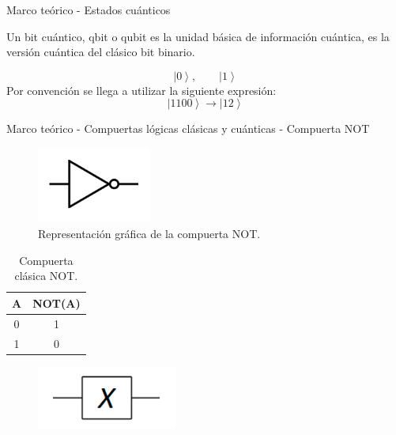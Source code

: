 \begin{frame}{Marco teórico - Estados cuánticos}
\begin{defi}
Un bit cuántico, qbit o qubit es la unidad básica de información cuántica, es la
versión cuántica del clásico bit binario.
\end{defi}
\begin{equation*}
\left| 0\right\rangle,     \qquad \left| 1\right\rangle 
\end{equation*}
Por convención se llega a utilizar la siguiente expresión:
\begin{equation*}
\left| 1100\right\rangle    \rightarrow \left|12 \right\rangle
\end{equation*}
\end{frame}

\begin{frame}{Marco teórico - Compuertas lógicas clásicas y cuánticas - Compuerta NOT}
\vspace{0.5cm}
 \begin{minipage}{0.49\linewidth}
    \begin{figure}[H]
        \centering
        \includegraphics[height=2.5cm]{images/not.png}
        \caption{Representación gráfica de la compuerta NOT.}
    \end{figure}
    \begin{table}[H]
        \centering
        \begin{tabular}{cc} \hline
            A & NOT(A)\\ \hline
            0 & 1 \\
            1 & 0 \\ \hline
        \end{tabular}
        \caption{Compuerta clásica NOT.}
    \end{table}
\end{minipage}
\begin{minipage}{0.49\linewidth}
    \begin{figure}[H]
        \centering
        \includegraphics[height=2.1cm]{images/not_c.png}

\end{figure}
\end{minipage}
\end{frame}
